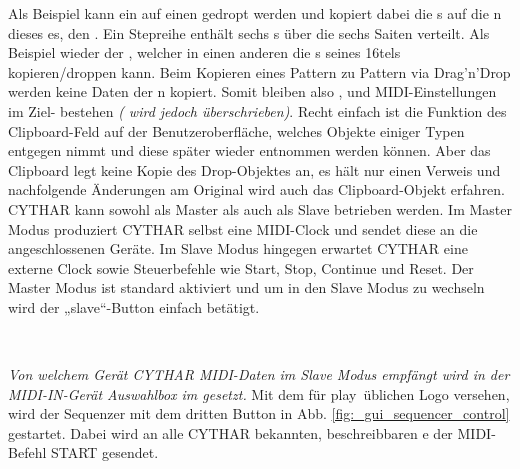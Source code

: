\documentclass[10pt,final,a4paper]{report}
\begin{document}
Als Beispiel kann ein  auf einen  gedropt werden und kopiert dabei die s auf die n dieses es, den .
%
%
%
Ein Stepreihe enthält sechs s über die sechs Saiten verteilt.
Als Beispiel wieder der , welcher in einen anderen  die s seines 16tels kopieren/droppen kann.
%
%
%
Beim Kopieren eines Pattern zu Pattern via Drag'n'Drop werden keine Daten der n kopiert. Somit bleiben also ,  und MIDI-Einstellungen im Ziel- bestehen \textit{( wird jedoch überschrieben)}.
%
%
%
Recht einfach ist die Funktion des Clipboard-Feld auf der Benutzeroberfläche, welches Objekte einiger Typen entgegen nimmt und diese später wieder entnommen werden können. Aber das Clipboard legt keine Kopie des Drop-Objektes an, es hält nur einen Verweis und nachfolgende Änderungen am Original wird auch das Clipboard-Objekt erfahren.
%
%
%
%
%
%
CYTHAR kann sowohl als Master als auch als Slave betrieben werden. Im Master Modus produziert CYTHAR selbst eine MIDI-Clock und sendet diese an die angeschlossenen Geräte. Im Slave Modus hingegen erwartet CYTHAR eine externe Clock sowie Steuerbefehle wie Start, Stop, Continue und Reset.
Der Master Modus ist standard aktiviert und um in den Slave Modus zu wechseln wird der „slave“-Button einfach betätigt.

~

\textit{Von welchem Gerät CYTHAR MIDI-Daten im Slave Modus empfängt wird in der MIDI-IN-Gerät Auswahlbox im  gesetzt.}
%
%
%
Mit dem für \gin play\gout~üblichen Logo versehen, wird der Sequenzer mit dem dritten Button in Abb. \ref{fig:_gui_sequencer_control} gestartet. Dabei wird an alle CYTHAR bekannten, beschreibbaren \LEXmididevice e der MIDI-Befehl START gesendet.
 
\end{document}

